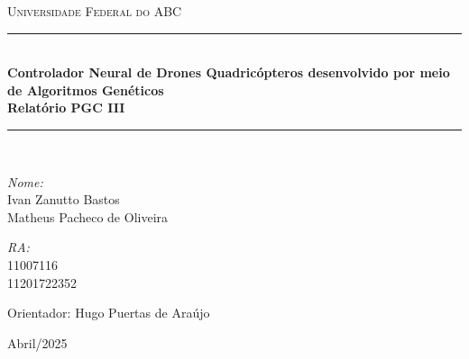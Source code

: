 \documentclass[12pt]{article}
\newcommand{\HRule}{\rule{\linewidth}{0.5mm}}
\begin{document}
\thispagestyle{empty}
\begin{center}
    \textsc{Universidade Federal do ABC}\\
    

    \vfill

    \HRule \\[0.2cm]
    {\Large\bfseries Controlador Neural de Drones Quadricópteros desenvolvido por meio de Algoritmos Genéticos}\\
    
    {\bfseries Relatório PGC III
    }\\
    \HRule \\[1.5cm]
     \vfill
    
    \begin{minipage}{0.4\textwidth}
    \begin{flushleft}
    \emph{Nome:}\\
    Ivan Zanutto Bastos \\
    Matheus Pacheco de Oliveira\\
    \end{flushleft}
    \end{minipage}
    \begin{minipage}{0.5\textwidth}
    \begin{flushright}
    \emph{RA:}\\
    11007116 \\
    11201722352 \\
    \end{flushright}
    \end{minipage}


    \vfill
    Orientador: Hugo Puertas de Araújo

    Abril/2025
\end{center}
\newpage

\newpage
{}
\begin{abstract}

O avanço tecnológico tem impulsionado o uso de drones autônomos em diversas áreas, destacando-se aplicações como agricultura de precisão, logística e gerenciamento de desastres, onde esses dispositivos oferecem maior eficiência e escalabilidade em comparação às operações humanas. Neste contexto, redes neurais artificiais surgem como uma solução promissora devido à sua capacidade de adaptação a ambientes dinâmicos e não lineares. Paralelamente, algoritmos genéticos (AGs) têm se mostrado eficazes na otimização de redes neurais, explorando de forma eficiente o espaço de soluções para ajustar os pesos e parâmetros dessas redes.

Este trabalho propõe o desenvolvimento de um controlador neural para drones quadricópteros utilizando AGs, com foco na navegação autônoma em ambientes simulados. O controlador será treinado para deslocar o drone até locais designados, assumindo que o voo ocorre continuamente, sem considerar decolagem ou pouso. Para isso, foi modelado um ambiente virtual utilizando a plataforma Gymnasium, implementada uma rede neural para controle do drone e implementados algoritmos genéticos para otimização do controlador.
\end{abstract}
\end{document}
